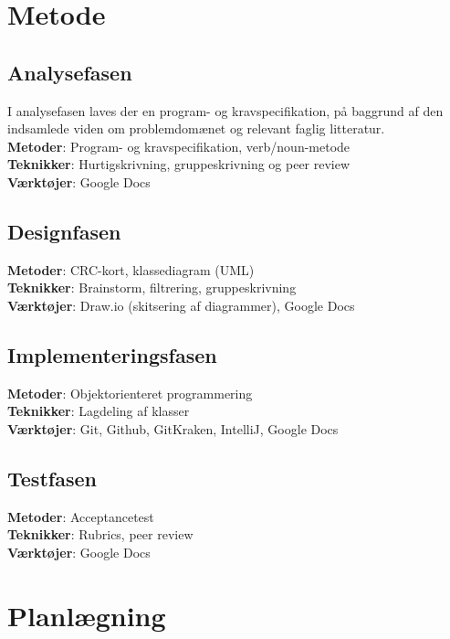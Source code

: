 \documentclass[a4paper,12pt]{report}
\begin{document}
\section{Metode}
\subsection{Analysefasen}
I analysefasen laves der en program- og kravspecifikation, på baggrund af den indsamlede viden om problemdomænet og relevant faglig litteratur. \\
\textbf{Metoder}: Program- og kravspecifikation, verb/noun-metode \\
\textbf{Teknikker}: Hurtigskrivning, gruppeskrivning og peer review \\
\textbf{Værktøjer}: Google Docs

\subsection{Designfasen}
\textbf{Metoder}: CRC-kort, klassediagram (UML) \\
\textbf{Teknikker}: Brainstorm, filtrering, gruppeskrivning \\
\textbf{Værktøjer}: Draw.io (skitsering af diagrammer), Google Docs

\subsection{Implementeringsfasen}
\textbf{Metoder}: Objektorienteret programmering \\
\textbf{Teknikker}: Lagdeling af klasser \\
\textbf{Værktøjer}: Git, Github, GitKraken, IntelliJ, Google Docs

\subsection{Testfasen}
\textbf{Metoder}: Acceptancetest \\
\textbf{Teknikker}: Rubrics, peer review \\
\textbf{Værktøjer}: Google Docs

\section{Planlægning}
\end{document}
